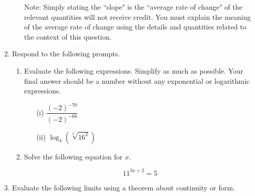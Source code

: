 \documentclass[11pt]{article}
\begin{document}
\begin{enumerate}
\begin{enumerate}
    Note: Simply stating the ``slope" is the ``average rate of change" of the relevant quantities will not receive credit. You must explain the meaning of the average rate of change using the details and quantities related to the context of this question.

    \vfill
    \vfill
\end{enumerate}


\newpage


\item Respond to the following prompts.

\begin{enumerate}
    \item Evaluate the following expressions. Simplify as much as possible. Your final answer should be a number without any exponential or logarithmic expressions.

    \begin{enumerate}
        \item[(i)] $\dfrac{(-2)^{-70}}{(-2)^{-66}}$

        \vfill

        \item[(ii)] $\log_{4}(\sqrt[5]{16^2})$

        \vfill
    \end{enumerate}

    \item Solve the following equation for $x$. 

    \[11^{3x+2}=5\]

    \vfill
\end{enumerate}


\newpage


\item Evaluate the following limits using a theorem about continuity or form.


\end{enumerate}
\end{document}
